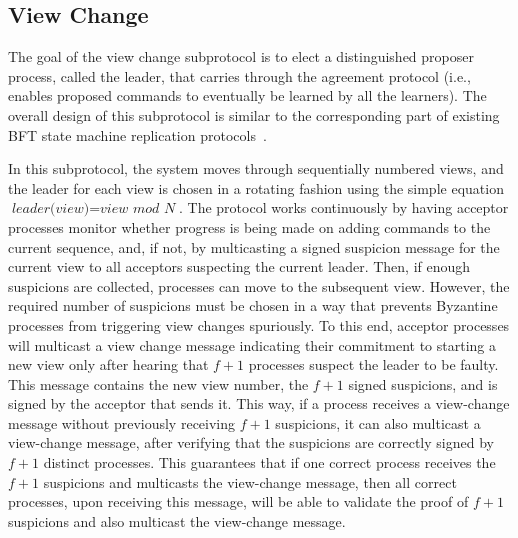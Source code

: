 \subsection{View Change} 

The goal of the view change subprotocol is to elect a distinguished proposer process, called the leader, that carries through the agreement protocol (i.e., enables proposed commands to eventually be learned by all the learners). The overall design of this subprotocol is similar to the corresponding part of existing BFT state machine replication protocols~\cite{CL99}.\par

In this subprotocol, the system moves through sequentially numbered views, and the leader for each view is chosen in a rotating fashion using the simple equation $\textit{leader(view)}=\textit{view mod N}$. The protocol works continuously by having acceptor processes monitor whether progress is being made on adding commands to the current sequence, and, if not, by multicasting a signed {\sc suspicion} message for the current view to all acceptors suspecting the current leader. Then, if enough suspicions are collected, processes can move to the subsequent view. However, the required number of suspicions must be chosen in a way that prevents Byzantine processes from triggering view changes spuriously. To this end, acceptor processes will multicast a view change message indicating their commitment to starting a new view only after hearing that $f+1$ processes suspect the leader to be faulty. This message contains the new view number, the $f+1$ signed suspicions, and is signed by the acceptor that sends it. This way, if a process receives a view-change message without previously receiving $f+1$ suspicions, it can also multicast a view-change message, after verifying that the suspicions are correctly signed by $f+1$ distinct processes.
This guarantees that if one correct process receives the $f+1$ suspicions and multicasts the view-change message, then all correct processes, upon receiving this message, will be able to validate the proof of $f+1$ suspicions and also multicast the view-change message.\par
